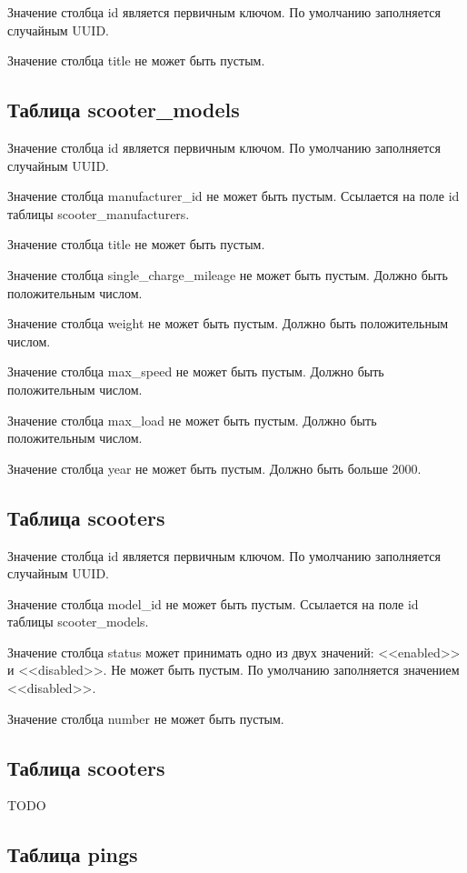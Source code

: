 Значение столбца id является первичным ключом. По умолчанию заполняется случайным UUID.

Значение столбца title не может быть пустым.

\subsection{Таблица scooter\_models}

Значение столбца id является первичным ключом. По умолчанию заполняется случайным UUID.

Значение столбца manufacturer\_id не может быть пустым. Ссылается на поле id таблицы scooter\_manufacturers.

Значение столбца title не может быть пустым.

Значение столбца single\_charge\_mileage не может быть пустым. Должно быть положительным числом.

Значение столбца weight не может быть пустым. Должно быть положительным числом.

Значение столбца max\_speed не может быть пустым. Должно быть положительным числом.

Значение столбца max\_load не может быть пустым. Должно быть положительным числом.

Значение столбца year не может быть пустым. Должно быть больше 2000.

\subsection{Таблица scooters}

Значение столбца id является первичным ключом. По умолчанию заполняется случайным UUID.

Значение столбца model\_id не может быть пустым. Ссылается на поле id таблицы scooter\_models.

Значение столбца status может принимать одно из двух значений: <<enabled>> и <<disabled>>. Не может быть пустым. По умолчанию заполняется значением <<disabled>>.

Значение столбца number не может быть пустым.

\subsection{Таблица scooters}

TODO

\subsection{Таблица pings}

